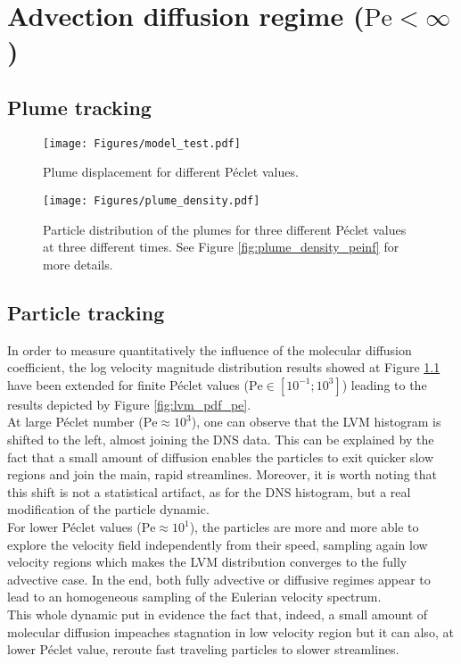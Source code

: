 \chapter{Advection diffusion regime ($\mathrm{Pe}<\infty$)}

\section{Plume tracking}
\begin{figure}[h!]
	\centering
	\texttt{[image: Figures/model\_test.pdf]}
	\caption{Plume displacement for different Péclet values.}
	\label{fig:lvm_pdf_peinf}
\end{figure}

\begin{figure}[h!]
	\centering
	\texttt{[image: Figures/plume\_density.pdf]}
	\caption{Particle distribution of the plumes for three different Péclet values at three different times. See Figure \ref{fig:plume_density_peinf} for more details.}
	\label{fig:plume_density}
\end{figure}


\section{Particle tracking}
In order to measure quantitatively the influence of the molecular diffusion coefficient, the log velocity magnitude distribution results showed at Figure \ref{fig:lvm_pdf_peinf} have been extended for finite Péclet values ($\mathrm{Pe}\in[10^{-1};10^3]$) leading to the results depicted by Figure \ref{fig:lvm_pdf_pe}.\\
At large Péclet number ($\mathrm{Pe}\approx 10^3$), one can observe that the LVM histogram is shifted to the left, almost joining the DNS data. 
This can be explained by the fact that a small amount of diffusion enables the particles to exit quicker slow regions and join the main, rapid streamlines.
Moreover, it is worth noting that this shift is not a statistical artifact, as for the DNS histogram, but a real modification of the particle dynamic.\\
For lower Péclet values ($\mathrm{Pe}\approx10^1$), the particles are more and more able to explore the velocity field independently from their speed, sampling again low velocity regions which makes the LVM distribution converges to the fully advective case.
In the end, both fully advective or diffusive regimes appear to lead to an homogeneous sampling of the Eulerian velocity spectrum.\\
This whole dynamic put in evidence the fact that, indeed, a small amount of molecular diffusion impeaches stagnation in low velocity region but it can also, at lower Péclet value, reroute fast traveling particles to slower streamlines.

